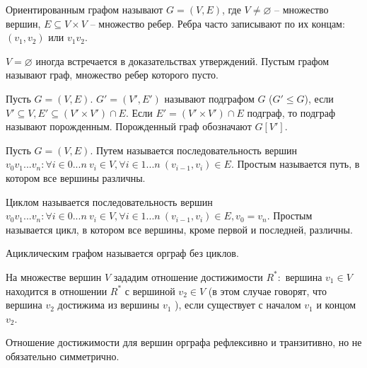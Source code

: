 
	\begin{Def}
		Ориентированным графом называют $G = (V, E)$, где $V \neq \varnothing$ -- множество вершин, $E \subseteq V \times V$ -- множество ребер.
		Ребра часто записывают по их концам: $(v_1, v_2)$ или $v_1 v_2$. 
	\end{Def}

	\begin{Rem}
		$V = \varnothing$ иногда встречается в доказательствах утверждений. Пустым графом называют граф, множество ребер которого пусто.
	\end{Rem}

	\begin{Def}
		Пусть $G = (V, E)$. $G' = (V', E')$ называют подграфом $G$ ($G' \leqslant G$), если $V' \subseteq V, E' \subseteq (V' \times V') \cap E$. Если $E' = (V' \times V') \cap E$ подграф, то подграф называют порожденным.
		Порожденный граф обозначают $G[V']$. 
	\end{Def}

	\begin{Def}
		Пусть $G = (V, E)$. Путем называется последовательность вершин $v_0 v_1 ... v_n : \forall i \in 0...n \ v_i \in V, \forall i \in 1...n \ (v_{i - 1}, v_i) \in E$.
		Простым называется путь, в котором все вершины различны. 
	\end{Def}

	\begin{Def}
		Циклом называется последовательность вершин $v_0 v_1 ... v_n : \forall i \in 0...n \ v_i \in V, \forall i \in 1 ... n \ (v_{i - 1}, v_i) \in E, v_0 = v_n$.
		Простым называется цикл, в котором все вершины, кроме первой и последней, различны. 
	\end{Def}

	\begin{Def}
		Ациклическим графом называется орграф без циклов.
	\end{Def}


	\begin{Def}
		На множестве вершин $V$ зададим отношение достижимости $R^*:$ вершина $v_1 \in V$ находится в отношении $R^*$ с вершиной $v_2 \in V$ 
	(в этом случае говорят, что вершина $v_2$ достижима из вершины $v_1$ ), если существует с началом $v_1$ и концом $v_2$.
	\end{Def} 

	\begin{Rem}
		Отношение достижимости для вершин орграфа рефлексивно и транзитивно, но не обязательно симметрично.
	\end{Rem}


